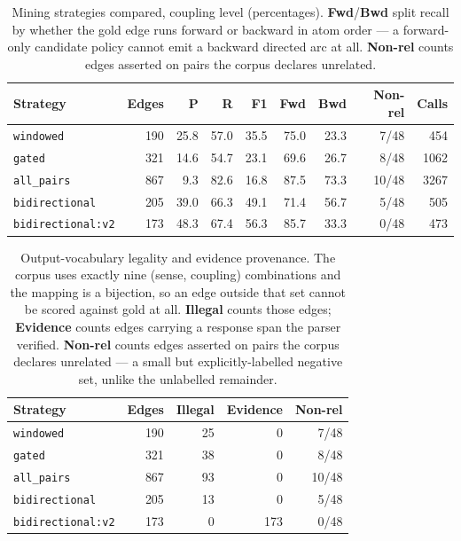 \documentclass[11pt]{article}
\begin{document}
\begin{table}[htbp]
\centering
\small
\caption{Mining strategies compared, coupling level (percentages). \textbf{Fwd}/\textbf{Bwd} split recall by whether the gold edge runs forward or backward in atom order --- a forward-only candidate policy cannot emit a backward directed arc at all. \textbf{Non-rel} counts edges asserted on pairs the corpus declares unrelated.}
\label{tab:strategy-comparison}
\begin{tabular}{lrrrrrrrr}
\toprule
Strategy & Edges & P & R & F1 & Fwd & Bwd & Non-rel & Calls \\
\midrule
\texttt{windowed} & 190 & 25.8 & 57.0 & 35.5 & 75.0 & 23.3 & 7/48 & 454 \\
\texttt{gated} & 321 & 14.6 & 54.7 & 23.1 & 69.6 & 26.7 & 8/48 & 1062 \\
\texttt{all\_pairs} & 867 & 9.3 & 82.6 & 16.8 & 87.5 & 73.3 & 10/48 & 3267 \\
\texttt{bidirectional} & 205 & 39.0 & 66.3 & 49.1 & 71.4 & 56.7 & 5/48 & 505 \\
\texttt{bidirectional:v2} & 173 & 48.3 & 67.4 & 56.3 & 85.7 & 33.3 & 0/48 & 473 \\
\bottomrule
\end{tabular}
\end{table}

\begin{table}[htbp]
\centering
\small
\caption{Output-vocabulary legality and evidence provenance. The corpus uses exactly nine (sense, coupling) combinations and the mapping is a bijection, so an edge outside that set cannot be scored against gold at all. \textbf{Illegal} counts those edges; \textbf{Evidence} counts edges carrying a response span the parser verified. \textbf{Non-rel} counts edges asserted on pairs the corpus declares unrelated --- a small but explicitly-labelled negative set, unlike the unlabelled remainder.}
\label{tab:vocabulary-legality}
\begin{tabular}{lrrrr}
\toprule
Strategy & Edges & Illegal & Evidence & Non-rel \\
\midrule
\texttt{windowed} & 190 & 25 & 0 & 7/48 \\
\texttt{gated} & 321 & 38 & 0 & 8/48 \\
\texttt{all\_pairs} & 867 & 93 & 0 & 10/48 \\
\texttt{bidirectional} & 205 & 13 & 0 & 5/48 \\
\texttt{bidirectional:v2} & 173 & 0 & 173 & 0/48 \\
\bottomrule
\end{tabular}
\end{table}
\end{document}
